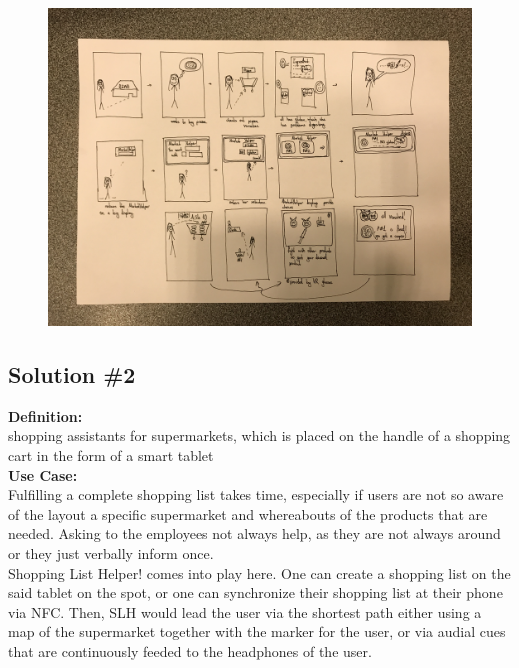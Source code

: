 \documentclass[a4paper,10pt,oneside]{scrreprt}
\begin{document}
			\begin{figure}[H]
				\centering

				\includegraphics[scale=0.16, clip, trim={40em 28em 40em 33em}]{images/s1.jpg}
			\end{figure}

		\clearpage
		\subsection{Solution \#2}

			\noindent \textbf{Definition:}\\
			shopping assistants for supermarkets, which is placed on the handle of a shopping cart in the form of a smart tablet\\

			\noindent \textbf{Use Case:}\\
			Fulfilling a complete shopping list takes time, especially if users are not so aware of the layout a specific supermarket and whereabouts of the products that are needed. Asking to the employees not always help, as they are not always around or they just verbally inform once.\\

			Shopping List Helper! comes into play here. One can create a shopping list on the said tablet on the spot, or one can synchronize their shopping list at their phone via NFC. Then, SLH would lead the user via the shortest path either using a map of the supermarket together with the marker for the user, or via audial cues that are continuously feeded to the headphones of the user.\\
\end{document}
